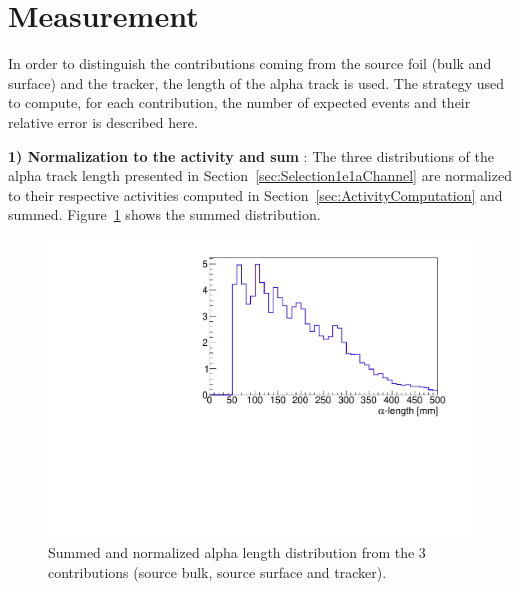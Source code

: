 \documentclass[main.tex]{subfiles}
\begin{document}

\section{Measurement}\label{sec:MeasurementStategy}

\noindent In order to distinguish the contributions coming from the source foil (bulk and surface) and the tracker, the length of the alpha track is used. The strategy used to compute, for each contribution, the number of expected events and their relative error is described here.


\bigskip


\noindent \textbf{1) Normalization to the activity and sum} : The three distributions of the alpha track length presented in Section~\ref{sec:Selection1e1aChannel} are normalized to their respective activities computed in Section~\ref{sec:ActivityComputation} and summed. Figure~\ref{ref_distribution} shows the summed distribution.


\begin{figure}[h!]
\begin{center}
\includegraphics[scale=0.55]{pictures/Chap5/basic_distribution_alpha_length.pdf}
\caption{Summed and normalized alpha length distribution from the 3 contributions (source bulk, source surface and tracker).}
\label{ref_distribution}
\end{center}
\end{figure}
\end{document}
